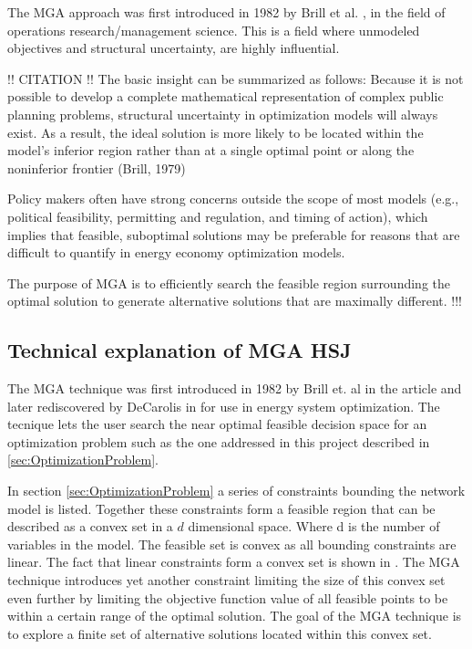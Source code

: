 The MGA approach was first introduced in 1982 by Brill et al. \cite{Brill_MGA_1982}, in the field of operations research/management science. This is a field where unmodeled objectives and structural uncertainty, are highly influential. 

!! CITATION !!
The basic insight can be
summarized as follows: Because it is not possible to develop a complete
mathematical representation of complex public planning problems,
structural uncertainty in optimization models will always exist. As a
result, the ideal solution is more likely to be located within the model's
inferior region rather than at a single optimal point or along the noninferior frontier (Brill, 1979)

Policy makers often have strong concerns outside the scope of most models
(e.g., political feasibility, permitting and regulation, and timing of
action), which implies that feasible, suboptimal solutions may be
preferable for reasons that are difficult to quantify in energy economy
optimization models.

The purpose of MGA is to efficiently search the feasible
region surrounding the optimal solution to generate alternative
solutions that are maximally different. !!!



\subsection{Technical explanation of MGA HSJ}

The MGA technique was first introduced in 1982 by Brill et. al in the article \cite{Brill_MGA_1982} and later rediscovered by DeCarolis in \cite{DeCarolis_MGA} for use in energy system optimization. The tecnique lets the user search the near optimal feasible decision space for an optimization problem such as the one addressed in this project described in \ref{sec:OptimizationProblem}. 

In section \ref{sec:OptimizationProblem} a series of constraints bounding the network model is listed. Together these constraints form a feasible region that can be described as a convex set in a $d$ dimensional space. Where d is the number of variables in the model. The feasible set is convex as all bounding constraints are linear. The fact that linear constraints form a convex set is shown in \cite{ConvexOpimization}. The MGA technique introduces yet another constraint limiting the size of this convex set even further by limiting the objective function value of all feasible points to be within a certain range of the optimal solution. The goal of the MGA technique is to explore a finite set of alternative solutions located within this convex set. 


